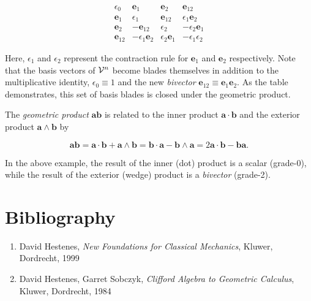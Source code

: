 \documentclass[12pt]{article}
\begin{document}
\[
\begin{array}{cccc}
\epsilon_{0} & \mathbf{e}_{1} & \mathbf{e}_{2} & \mathbf{e}_{12} \\
\mathbf{e}_{1} & \epsilon_{1} & \mathbf{e}_{12} & \epsilon_{1}\mathbf{e}_{2} \\
\mathbf{e}_{2} & -\mathbf{e}_{12} & \epsilon_{2} & -\epsilon_{2}\mathbf{e}_{1} \\
\mathbf{e}_{12} & -\epsilon_{1}\mathbf{e}_{2} & \epsilon_{2}\mathbf{e}_{1} & -\epsilon_{1}\epsilon_{2}
\end{array}
\]

Here, $\epsilon_{1}$ and $\epsilon_{2}$ represent the contraction rule for $\mathbf{e}_{1}$ and $\mathbf{e}_{2}$ respectively.  Note that the basis vectors of ${\cal{V}}^{n}$ become blades themselves in addition to the multiplicative identity, $\epsilon_{0} \equiv 1$ and the new \emph{bivector} $\mathbf{e}_{12} \equiv \mathbf{e}_{1}\mathbf{e}_{2}$.  As the table demonstrates, this set of basis blades is closed under the geometric product.

The \emph{geometric product} $\mathbf{a}\mathbf{b}$ is related to the inner product $\mathbf{a}\cdot\mathbf{b}$ and the exterior product $\mathbf{a}\wedge\mathbf{b}$ by

\[
\mathbf{a}\mathbf{b} = \mathbf{a}\cdot\mathbf{b}+\mathbf{a}\wedge\mathbf{b} = \mathbf{b}\cdot\mathbf{a}-\mathbf{b}\wedge\mathbf{a} = 2\mathbf{a}\cdot\mathbf{b}-\mathbf{b}\mathbf{a}.
\]

In the above example, the result of the inner (dot) product is a scalar (grade-0), while the result of the exterior (wedge) product is a \emph{bivector} (grade-2).

\section*{Bibliography}
\begin{enumerate}
\item David Hestenes, {\em New Foundations for Classical Mechanics}, Kluwer, Dordrecht, 1999
\item David Hestenes, Garret Sobczyk, {\em Clifford Algebra to Geometric Calculus}, Kluwer, Dordrecht, 1984
\end{enumerate}
\end{document}
